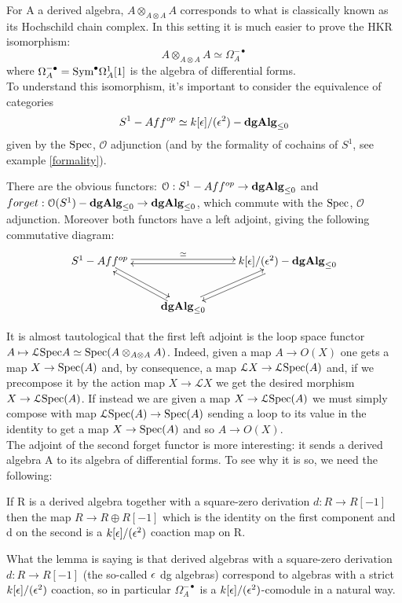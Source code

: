 \begin{refsection}
For A a derived algebra, $A\otimes_{A\otimes A}A$ corresponds to what is classically known as its Hochschild chain complex. In this setting it is much easier to
prove the HKR isomorphism: $$A\otimes_{A\otimes A}A\simeq \Omega_A^{-\bullet}$$ where $\Omega_A^{-\bullet}=\text{Sym}^{\bullet} \Omega^1_A[1]$ is the algebra of
differential forms.\\

To understand this isomorphism, it's important to consider the equivalence of categories $$S^1-Aff^{op}\simeq k[\epsilon]/(\epsilon^2)-\mathbf{dgAlg}_{\leq 0}$$ 
given by the $\mathrm{Spec}$, $\mathcal{O}$ adjunction (and by the formality of cochains of $S^1$, see example \ref{formality}).

There are the obvious functors: $\mathcal{O} :S^1-Aff^{op}\to \mathbf{dgAlg}_{\leq 0}$ and $forget: \mathcal{O}(S^1)-\mathbf{dgAlg}_{\leq 0}\to\mathbf{dgAlg}_{\leq 0}$, which commute with the $\mathrm{Spec}$, $\mathcal{O}$ adjunction.
Moreover both functors have a left adjoint, giving the following commutative diagram:
\begin{displaymath}
\xymatrix{
S^1-Aff^{op} \ar@<2pt>[dr]  \ar@<2pt>[rr]^-\simeq&  & \cerchio-\dalg\ar@<2pt>[dl] \ar@<2pt>[ll]\\
& \dalg \ar@<2pt>[ur] \ar@<2pt>[ul]&
}
\end{displaymath}

It is almost tautological that the first left adjoint is the loop space functor $A\mapsto \mathcal{L}\mathrm{Spec} A\simeq \mathrm{Spec}(A\otimes_{A\otimes A}A)$.
Indeed, given a map $A\to O(X)$ one gets a map $X\to \mathrm{Spec}(A)$ and, by consequence, a map $\mathcal{L} X\to \mathcal{L}\mathrm{Spec}(A)$ and, if we precompose it by the action map $X\to \mathcal{L} X$
we get the desired morphism $X\to \mathcal{L}\mathrm{Spec}(A)$. If instead we are given a map $X\to \mathcal{L}\mathrm{Spec}(A)$ we must simply compose with map $\mathcal{L}\mathrm{Spec}(A)\to \mathrm{Spec}(A)$ sending a loop
to its value in the identity to get a map $X\to \mathrm{Spec}(A)$ and so $A\to O(X)$.\\

The adjoint of the second forget functor is more interesting: it sends a derived algebra A to its algebra of differential forms. To see why it is so, we need the following:
\begin{lemma}
If R is a derived algebra together with a square-zero derivation $d:R\to R[-1]$ then the map $R\to R\oplus R[-1]$ which is the identity on the first component
and d on the second is a $k[\epsilon]/(\epsilon^2)$ coaction map on R.
\end{lemma}

What the lemma is saying is that derived algebras with a square-zero derivation $d:R\to R[-1]$ (the so-called $\epsilon$ dg algebras) correspond to algebras with a
strict $k[\epsilon]/(\epsilon^2)$ coaction, so in particular $\Omega_A^{-\bullet}$ is a $k[\epsilon]/(\epsilon^2)$-comodule in a natural way.


\end{refsection}
